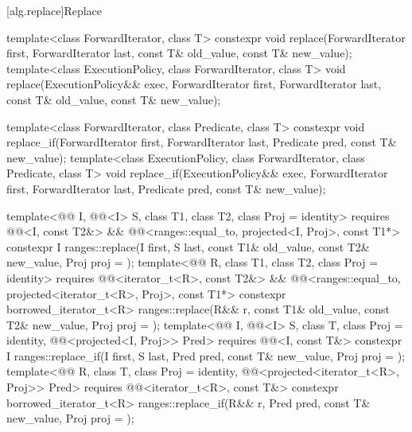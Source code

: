 [alg.replace]{Replace}

%
%
\begin{itemdecl}
template<class ForwardIterator, class T>
  constexpr void replace(ForwardIterator first, ForwardIterator last,
                         const T& old_value, const T& new_value);
template<class ExecutionPolicy, class ForwardIterator, class T>
  void replace(ExecutionPolicy&& exec,
               ForwardIterator first, ForwardIterator last,
               const T& old_value, const T& new_value);

template<class ForwardIterator, class Predicate, class T>
  constexpr void replace_if(ForwardIterator first, ForwardIterator last,
                            Predicate pred, const T& new_value);
template<class ExecutionPolicy, class ForwardIterator, class Predicate, class T>
  void replace_if(ExecutionPolicy&& exec,
                  ForwardIterator first, ForwardIterator last,
                  Predicate pred, const T& new_value);

template<@@ I, @@<I> S, class T1, class T2, class Proj = identity>
  requires @@<I, const T2&> &&
           @@<ranges::equal_to, projected<I, Proj>, const T1*>
  constexpr I
    ranges::replace(I first, S last, const T1& old_value, const T2& new_value, Proj proj = {});
template<@@ R, class T1, class T2, class Proj = identity>
  requires @@<iterator_t<R>, const T2&> &&
           @@<ranges::equal_to, projected<iterator_t<R>, Proj>, const T1*>
  constexpr borrowed_iterator_t<R>
    ranges::replace(R&& r, const T1& old_value, const T2& new_value, Proj proj = {});
template<@@ I, @@<I> S, class T, class Proj = identity,
         @@<projected<I, Proj>> Pred>
  requires @@<I, const T&>
  constexpr I ranges::replace_if(I first, S last, Pred pred, const T& new_value, Proj proj = {});
template<@@ R, class T, class Proj = identity,
         @@<projected<iterator_t<R>, Proj>> Pred>
  requires @@<iterator_t<R>, const T&>
  constexpr borrowed_iterator_t<R>
    ranges::replace_if(R&& r, Pred pred, const T& new_value, Proj proj = {});
\end{itemdecl}

